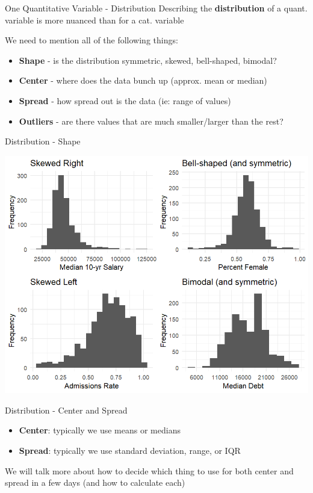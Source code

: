 \documentclass{beamer}
\begin{document}
\begin{frame}{One Quantitative Variable - Distribution}
Describing the \textbf{distribution} of a quant. variable is more nuanced than for a cat. variable \vspace{4mm}

We need to mention all of the following things:
\begin{itemize}%
 \item \textbf{Shape} - is the distribution symmetric, skewed, bell-shaped, bimodal?
 \item \textbf{Center} - where does the data bunch up (approx. mean or median)
 \item \textbf{Spread} - how spread out is the data (ie: range of values)
 \item \textbf{Outliers} - are there values that are much smaller/larger than the rest?
\end{itemize}
\end{frame}

\begin{frame}{Distribution - Shape}
\begin{center}
    \includegraphics[scale=.6]{img/HistogramShapeExamples.png}
\end{center}
\end{frame}

\begin{frame}{Distribution - Center and Spread}
\begin{itemize}
    \item \textbf{Center}: typically we use means or medians
    \item \textbf{Spread}: typically we use standard deviation, range, or IQR
\end{itemize} \vspace{3mm}

We will talk more about how to decide which thing to use for both center and spread in a few days (and how to calculate each)  
\end{frame}
\end{document}
